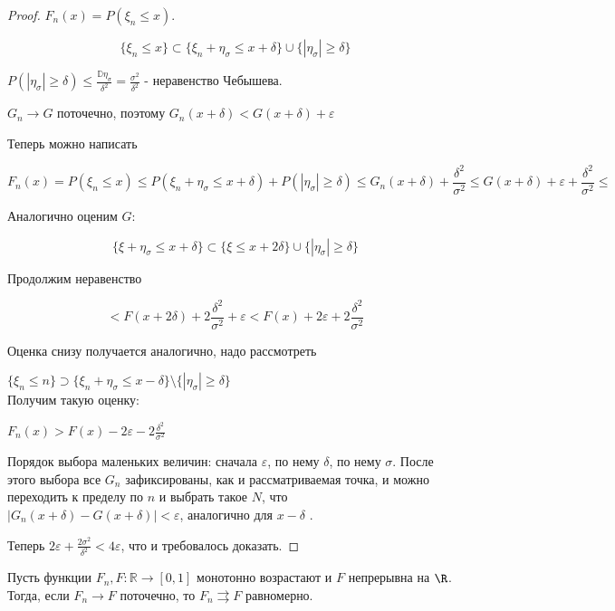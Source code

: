 \begin{proof}
     $F_n(x) = P(\xi_n \leq x)$. 
     
     \[ \{\xi_n \leq x\} \subset \{\xi_n + \eta_\sigma \leq x + \delta \} \cup \{ |\eta_\sigma| \geq \delta\}\]

     $P(|\eta_\sigma| \geq \delta) \leq \frac{\mathbb{D} \eta_\sigma}{\delta^2} = \frac{\sigma^2}{\delta^2}$ - неравенство Чебышева.
     
     $G_n \to G$ поточечно, поэтому $G_n(x + \delta) < G(x+\delta) + \varepsilon$
     
     Теперь можно написать
     
     \[  F_n(x) = P(\xi_n \leq x) \leq P(\xi_n + \eta_\sigma \leq x + \delta) + P(|\eta_\sigma| \geq \delta) \leq G_n(x+\delta) + \frac{\delta^2}{\sigma^2} \leq G(x+\delta) + \varepsilon +  \frac{\delta^2}{\sigma^2} \leq
     \]
     
     Аналогично оценим $G$:
     
     \[ \{\xi + \eta_\sigma \leq x + \delta\} \subset \{\xi \leq x + 2\delta \} \cup \{ |\eta_\sigma| \geq \delta\}
     \]
     
     Продолжим неравенство
     
     \[ < F(x + 2\delta) + 2\frac{\delta^2}{\sigma^2} + \varepsilon < F(x) + 2\varepsilon + 2\frac{\delta^2}{\sigma^2}
     \]
     
     
     Оценка снизу получается аналогично, надо рассмотреть
     
     $\{\xi_n \leq n\} \supset \{\xi_n + \eta_\sigma \leq x - \delta\} \setminus \{|\eta_\sigma| \geq \delta\}$\\
     
     Получим такую оценку:
     
     $F_n(x) > F(x) - 2\varepsilon - 2\frac{\delta^2}{\sigma^2}$
     
     Порядок выбора маленьких величин: сначала $\varepsilon$, по нему $\delta$, по нему $\sigma$. После этого выбора все $G_n$ зафиксированы, как и рассматриваемая точка, и можно переходить к пределу по $n$ и выбрать такое $N$, что $|G_n(x+\delta) - G(x + \delta)| < \varepsilon$, аналогично для $x-\delta$ .
     
     Теперь $2\varepsilon + \frac{2\sigma^2}{\delta^2} < 4\varepsilon$, что и требовалось доказать.
     
 \end{proof}

 \begin{theorem}
     Пусть функции $F_n, F\colon\mathbb{R}\rightarrow [0, 1]$ монотонно возрастают и $F$ непрерывна на $\R$. Тогда, если $F_n\rightarrow F$ поточечно, то $F_n\rightrightarrows F$ равномерно.
 \end{theorem}


